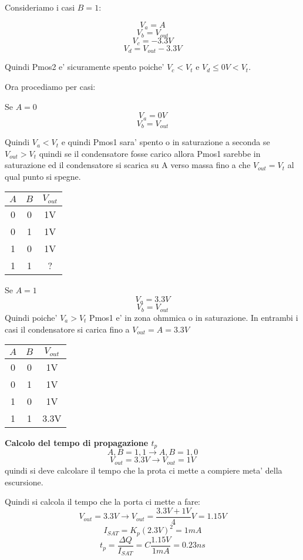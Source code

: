 \documentclass[\main/main.tex]{subfiles}
\begin{document}
Consideriamo i casi $B = 1$:

\[V_a = A \]
\[V_b = V_{out} \]
\[V_c =  - 3.3V\]
\[V_d = V_{out} - 3.3V\]

Quindi Pmos2 e' sicuramente spento poiche' $V_c < V_t$ e $V_d \leq 0V < V_t$.

Ora procediamo per casi:

Se $A = 0$
\[V_a = 0V \]
\[V_b = V_{out} \]

Quindi $V_a < V_t$ e quindi Pmos1 sara' spento o in saturazione a seconda se $V_{out} > V_t$ quindi se il condensatore fosse carico allora Pmos1 sarebbe in saturazione ed il condensatore si scarica su A verso massa fino a che $V_{out} = V_t$ al qual punto si spegne.

\begin{center}
	\begin{tabular}{ c c | c }
		$A$ & $B$ & $V_{out}$ \\
		\hline
		0   & 0   & 1V        \\
		0   & 1   & 1V        \\
		1   & 0   & 1V        \\
		1   & 1   & ?         \\
	\end{tabular}
\end{center}

Se $A = 1$
\[V_a = 3.3V \]
\[V_b = V_{out} \]
Quindi poiche' $V_a > V_t$ Pmos1 e' in zona ohmmica o in saturazione. In entrambi i casi il condensatore si carica fino a $V_{out} = A = 3.3V
$

\begin{center}
	\begin{tabular}{ c c | c }
		$A$ & $B$ & $V_{out}$ \\
		\hline
		0   & 0   & 1V        \\
		0   & 1   & 1V        \\
		1   & 0   & 1V        \\
		1   & 1   & 3.3V      \\
	\end{tabular}
\end{center}

\textbf{Calcolo del tempo di propagazione $t_p$}
\[A,B = 1,1 \longrightarrow A,B = 1,0\]
\[V_{out} = 3.3V \longrightarrow V_{out} = 1V\]
quindi si deve calcolare il tempo che la prota ci mette a compiere meta' della escursione.

Quindi si calcola il tempo che la porta ci mette a fare:
\[V_{out} = 3.3V \longrightarrow V_{out} = \frac{3.3V+1V}{4}V = 1.15V\]
\[I_{SAT} = K_p (2.3V)^2 = 1mA\]
\[t_p = \frac{\Delta Q}{I_{SAT}} = C\frac{1.15V}{1mA} = 0.23ns\]
\end{document}
